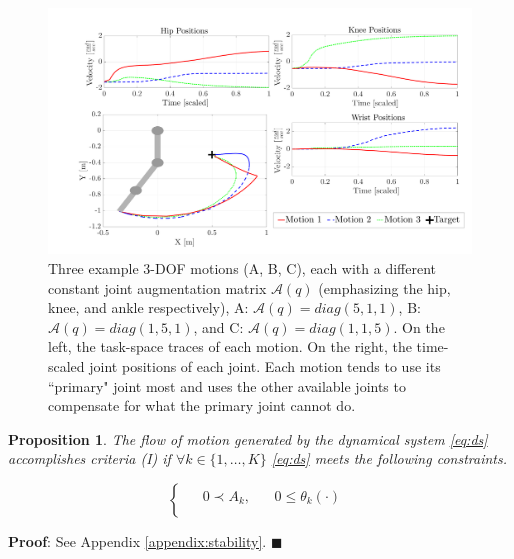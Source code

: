 \documentclass[letterpaper, 10 pt, conference,fleqn]{ieeeconf}
\begin{document}
\begin{figure}[t]
\centering
\includegraphics[width=\linewidth]{Pic/A_comparison_positions.pdf}
\caption{Three example 3-DOF motions (A, B, C), each with a different constant joint augmentation matrix $\mathcal{A}(q)$ (emphasizing the hip, knee, and ankle respectively), A: $\mathcal{A}(q)=diag(5,1,1) $, B: $\mathcal{A}(q)=diag(1,5,1)$, and C: $\mathcal{A}(q)=diag(1,1,5)$. On the left, the task-space traces of each motion. On the right, the time-scaled joint positions of each joint. Each motion tends to use its ``primary" joint most and uses the other available joints to compensate for what the primary joint cannot do.}
\label{fig:A_example}
\vspace{-15pt}
\end{figure}


\newtheorem{prop1}{Proposition}
\begin{prop1}
\label{prop:stability}
The flow of motion generated by the dynamical system \eqref{eq:ds} accomplishes criteria (I) if $ \forall k \in \{1,\dots,K\}  $ \eqref{eq:ds} meets the following constraints. 

\begin{equation}
\label{eq:first_criteria_stability}
\begin{cases}
\begin{split}
 & 0 \prec A_k, & ~~~~ 0 \leq \theta_k(\cdot) \\
\end{split}
\end{cases}
\end{equation}    
\end{prop1}

\textbf{Proof}: See Appendix \ref{appendix:stability}. $\blacksquare$
\end{document}
